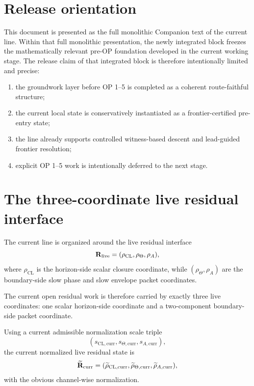 
\section{Release orientation}
This document is presented as the full monolithic Companion text of the current line. Within that full monolithic presentation, the newly integrated  block freezes the mathematically relevant pre-OP foundation developed in the current working stage. The release claim of that integrated block is therefore intentionally limited and precise:
\begin{enumerate}[leftmargin=2em]
 \item the groundwork layer before OP 1--5 is completed as a coherent route-faithful structure;
 \item the current local state is conservatively instantiated as a frontier-certified pre-entry state;
 \item the line already supports controlled witness-based descent and lead-guided frontier resolution;
 \item explicit OP 1--5 work is intentionally deferred to the next stage.
\end{enumerate}

\section{The three-coordinate live residual interface}
\begin{definition}\label{def:live-residual-interface}
The current line is organized around the live residual interface
\[
\mathbf{R}_{\mathrm{live}}=(\rho_{\mathrm{CL}},\rho_{\Theta},\rho_{A}),
\]
where $\rho_{\mathrm{CL}}$ is the horizon-side scalar closure coordinate, while $(\rho_{\Theta},\rho_{A})$ are the boundary-side slow phase and slow envelope packet coordinates.
\end{definition}

\begin{remark}
The current open residual work is therefore carried by exactly three live coordinates: one scalar horizon-side coordinate and a two-component boundary-side packet coordinate.
\end{remark}

\begin{definition}\label{def:current-normalized-state}
Using a current admissible normalization scale triple
\[
(s_{\mathrm{CL,curr}},s_{\Theta,\mathrm{curr}},s_{A,\mathrm{curr}}),
\]
the current normalized live residual state is
\[
\widetilde{\mathbf{R}}_{\mathrm{curr}}=(\widetilde{\rho}_{\mathrm{CL,curr}},\widetilde{\rho}_{\Theta,\mathrm{curr}},\widetilde{\rho}_{A,\mathrm{curr}}),
\]
with the obvious channel-wise normalization.
\end{definition}

